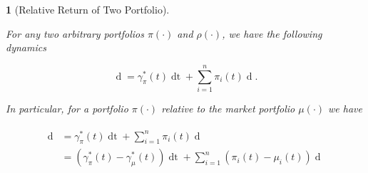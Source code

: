 \documentclass[british]{amsart} \usepackage{lmodern}
\numberwithin{equation}{section} \numberwithin{figure}{section}
\theoremstyle{plain} \newtheorem{thm}{\protect\theoremname}[section]
\theoremstyle{definition} \newtheorem{defn}[thm]{\protect\definitionname}
\theoremstyle{plain} \newtheorem{assumption}[thm]{\protect\assumptionname}
\theoremstyle{plain} \newtheorem{lem}[thm]{\protect\lemmaname}
\theoremstyle{plain} \newtheorem{prop}[thm]{\protect\propositionname}
\theoremstyle{remark} \newtheorem{rem}[thm]{\protect\remarkname}
\theoremstyle{plain} \newtheorem{cor}[thm]{\protect\corollaryname}
\renewcommand{\d}[1]{\mathop{\mathrm{d}{#1}}}
\begin{document}
\begin{lem} [Relative Return of Two Portfolio]
  \label{lem:relativereturnoftwoportfolios}

  For any two arbitrary portfolios $\pi(\cdot)$ and $\rho(\cdot)$, we have the
  following dynamics

  \begin{equation}    
    \label{eq:rrdynamics} 
      \d{\log{ \left( \frac{ V^{\pi}(t) }{V^{\rho}(t) } \right) } } = 
        \gamma_{\pi}^{*}(t)\d{t} + 
         \sum_{i=1}^{n} \pi_{i}(t) 
            \d{\log{ \left( \frac{ X_{i}(t) }{ V^{\rho}(t)} \right) }}. 
  \end{equation}

  In particular, for a portfolio $\pi(\cdot)$ relative to the market portfolio
  $\mu(\cdot)$ we have

  \begin{gather} 
    \label{eq:rrdynamics2} 
    \begin{split} 
      \d{ \log{ \left( \frac{V^{\pi}(t) }{ V^{\mu}(t) } \right) } } 
      &= \gamma_{\pi}^{*}(t)\d{t} + 
            \sum_{i=1}^{n} \pi_{i}(t)  \d{ \log{\mu_{i}(t)} } \\ 
      &= (\gamma_{\pi}^{*}(t) - \gamma_{\mu}^{*}(t)) \d{t} +
            \sum_{i=1}^{n} (\pi_{i}(t) - \mu_{i}(t)) \d{\log{\mu_{i}(t)} } \\ 
    \end{split} 
  \end{gather}

\end{lem}
\end{document}
